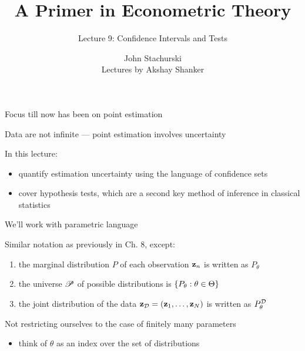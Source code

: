 





\title{A Primer in Econometric Theory}

\subtitle
{Lecture 9: Confidence Intervals and Tests}

\author{John Stachurski \\ \tiny Lectures by Akshay Shanker}






\begin{frame}
  \titlepage
\end{frame}


\begin{frame}
    
    \vspace{2em}
    Focus till now has been on point estimation
    
    Data are not
    infinite --- point estimation involves uncertainty
    
    \vspace{.7em}
    In this lecture:
    \begin{itemize}
        \item quantify estimation uncertainty using the language
    of confidence sets
        \item cover hypothesis tests, which are a second key
    method of inference in classical statistics
    \end{itemize}
\end{frame}


\begin{frame}
    
    \vspace{2em}
    We'll work with parametric
    language
    
    Similar notation as previously in Ch. 8, except:
    \begin{enumerate}
        \item the marginal distribution $P$ of each observation ${\mathbf z}_n$ is
            written as $P_{\theta}$
        \item the universe $\mathscr P$ of possible distributions is
            $\{ P_{\theta} : \theta \in \Theta \}$
        \item the joint distribution of the data $\mathbf{z}_{\mathcal D} = ({\mathbf z}_1,
            \ldots, {\mathbf z}_N)$ is written as $P^{\mathcal D}_{\theta}$
    \end{enumerate}
    
    \vspace{.7em}
    Not restricting ourselves to the case of finitely many
    parameters
    
    \begin{itemize}
        \item think of $\theta$ as an index
        over the set of distributions
    \end{itemize}

\end{frame}

